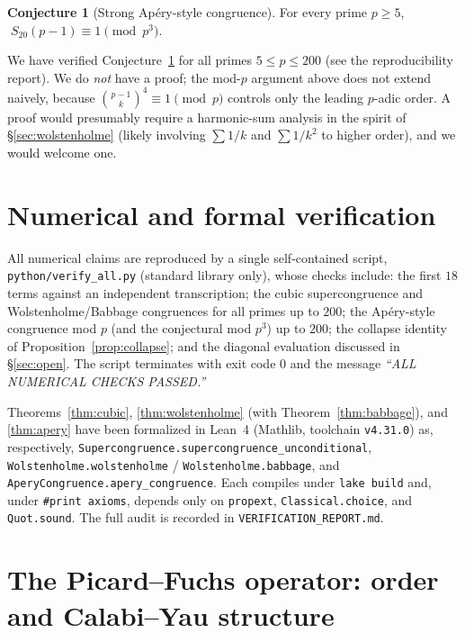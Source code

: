 \documentclass[11pt,a4paper]{article}
\theoremstyle{definition}
\newtheorem{conjecture}[theorem]{Conjecture}
\theoremstyle{remark}
\newcommand{\Sx}{S_{20}}
\begin{document}
\begin{conjecture}[Strong Ap\'ery-style congruence]\label{conj:apery3}
For every prime $p\ge 5$, $\;\Sx(p-1)\equiv 1\pmod{p^{3}}$.
\end{conjecture}

We have verified Conjecture~\ref{conj:apery3} for all primes $5\le p\le 200$
(see the reproducibility report).  We do \emph{not} have a proof; the mod-$p$
argument above does not extend naively, because $\binom{p-1}{k}^4\equiv 1\pmod
p$ controls only the leading $p$-adic order.  A proof would presumably require a
harmonic-sum analysis in the spirit of \S\ref{sec:wolstenholme} (likely
involving $\sum 1/k$ and $\sum 1/k^2$ to higher order), and we would welcome one.

\section{Numerical and formal verification}\label{sec:verification}

All numerical claims are reproduced by a single self-contained script,
\texttt{python/verify\_all.py} (standard library only), whose checks include:
the first $18$ terms against an independent transcription; the cubic
supercongruence and Wolstenholme/Babbage congruences for all primes up to
$200$; the Ap\'ery-style congruence mod $p$ (and the conjectural mod $p^3$) up
to $200$; the collapse identity of Proposition~\ref{prop:collapse}; and the
diagonal evaluation discussed in \S\ref{sec:open}.  The script terminates with
exit code $0$ and the message \emph{``ALL NUMERICAL CHECKS PASSED.''}

Theorems~\ref{thm:cubic}, \ref{thm:wolstenholme} (with
Theorem~\ref{thm:babbage}), and \ref{thm:apery} have been formalized in Lean~4
(Mathlib, toolchain \texttt{v4.31.0}) as, respectively,
\texttt{Supercongruence.supercongruence\_unconditional},
\texttt{Wolstenholme.wolstenholme} / \texttt{Wolstenholme.babbage}, and
\texttt{AperyCongruence.apery\_congruence}.  Each compiles under
\texttt{lake build} and, under \texttt{\#print axioms}, depends only on
\texttt{propext}, \texttt{Classical.choice}, and \texttt{Quot.sound}.  The full
audit is recorded in \texttt{VERIFICATION\_REPORT.md}.

\section{The Picard--Fuchs operator: order and Calabi--Yau structure}
\label{sec:operator}
\end{document}
